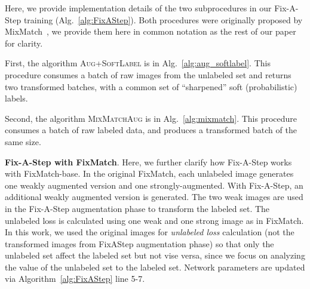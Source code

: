 Here, we provide implementation details of the two subprocedures in our Fix-A-Step training (Alg.~\ref{alg:FixAStep}).
Both procedures were originally proposed by MixMatch~\citep{berthelotMixMatchHolisticApproach2019}, we provide them here in common notation as the rest of our paper for clarity.

First, the algorithm \textsc{Aug+SoftLabel} is in Alg.~\ref{alg:aug_softlabel}. This procedure consumes a batch of raw images from the unlabeled set and returns two transformed batches, with a common set of ``sharpened'' soft (probabilistic) labels.

Second, the algorithm \textsc{MixMatchAug} is in Alg.~\ref{alg:mixmatch}. This procedure consumes a batch of raw labeled data, and produces a transformed batch of the same size.





\textbf{Fix-A-Step with FixMatch}. 
Here, we further clarify how Fix-A-Step works with FixMatch-base. In the original FixMatch, each unlabeled image generates one weakly augmented version and one strongly-augmented. With
Fix-A-Step, an additional weakly augmented version is generated. The two weak images are used in the Fix-A-Step augmentation phase to transform the labeled set. The unlabeled loss is calculated using one weak and one strong image as in FixMatch. In this work, we used the original images for \textit{unlabeled loss} calculation (not the transformed images from FixAStep augmentation phase) so that only the unlabeled set affect the labeled set but not vise versa, since we focus on analyzing the value of the unlabeled set to the labeled set. Network parameters are updated via Algorithm~\ref{alg:FixAStep} line 5-7.